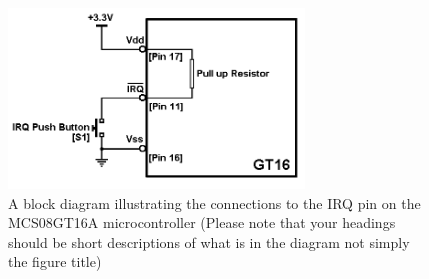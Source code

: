 \begin{figure}[ht]
\centering
\includegraphics[width=0.7\textwidth]{model.png}
\caption{A block diagram illustrating the connections to the IRQ pin on the MCS08GT16A microcontroller (Please
note that your headings should be short descriptions of what is in the diagram not simply the figure title)}
\label{fig:model}
\end{figure}

